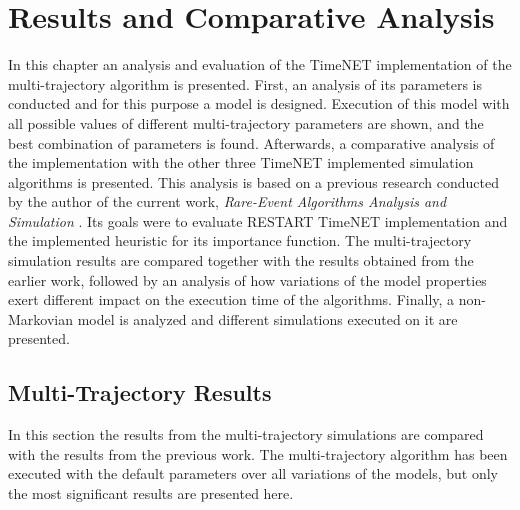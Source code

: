 
\chapter{Results and Comparative Analysis} 
\label{ch:Results and Comparative Analysis}
In this chapter an analysis and evaluation of the TimeNET implementation of the multi-trajectory algorithm is presented. First, an analysis of its parameters is conducted and for this purpose a model is designed. Execution of this model with all possible values of different multi-trajectory parameters are shown, and the best combination of parameters is found. Afterwards, a comparative analysis of the implementation with the other three TimeNET implemented simulation algorithms is presented. This analysis is based on a previous research conducted by the author of the current work, \textit{Rare-Event Algorithms Analysis and Simulation} \cite{canabal:rareeventproject}. Its goals were to evaluate RESTART TimeNET implementation and the implemented heuristic for its importance function. The multi-trajectory simulation results are compared together with the results obtained from the earlier work, followed by an analysis of how variations of the model properties exert different impact on the execution time of the algorithms. Finally, a non-Markovian model is analyzed and different simulations executed on it are presented.


\section{Multi-Trajectory Results}
In this section the results from the multi-trajectory simulations are compared with the results from the previous work. The multi-trajectory algorithm has been executed with the default parameters over all variations of the models, but only the most significant results are presented here. 


